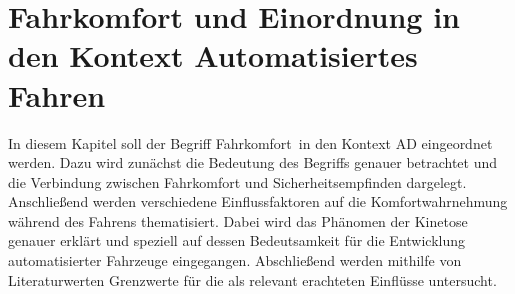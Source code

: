 \chapter{Fahrkomfort und Einordnung in den Kontext Automatisiertes Fahren}\label{cha:Komfort}
In diesem Kapitel soll der Begriff \glqq Fahrkomfort\grqq~in den Kontext \gls{AD} eingeordnet werden. Dazu wird zunächst die Bedeutung des Begriffs genauer betrachtet und die Verbindung zwischen Fahrkomfort und Sicherheitsempfinden dargelegt. Anschließend werden verschiedene Einflussfaktoren auf die Komfortwahrnehmung während des Fahrens thematisiert. Dabei wird das Phänomen der Kinetose genauer erklärt und speziell auf dessen Bedeutsamkeit für die Entwicklung automatisierter Fahrzeuge eingegangen. Abschließend werden mithilfe von Literaturwerten Grenzwerte für die als relevant erachteten Einflüsse untersucht. 

